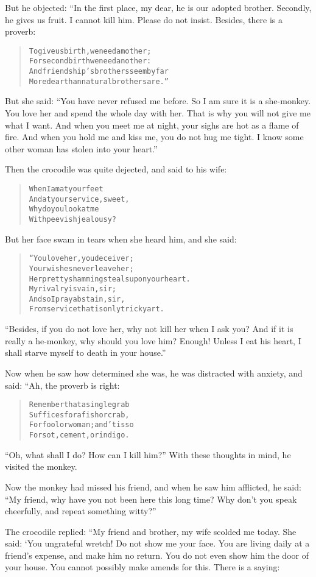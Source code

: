 \documentclass[article, twoside, 14pt]{memoir}
\renewenvironment{verbatim}{%
\begin{quote}%
\vskip -10pt%
\begin{alltt}\normalfont\large}{\end{alltt}%
\end{quote}%
\vskip -10pt
} %
\begin{document}
But he objected: “In the first place, my dear, he is our adopted
brother. Secondly, he gives us fruit. I cannot kill him. Please do
not insist. Besides, there is a proverb:

\begin{verbatim}
To give us birth, we need a mother;
For second birth we need another:
And friendship's brothers seem by far
More dear than natural brothers are.”
\end{verbatim}
But she said:
``You have never refused me before. So I am sure it is a she-monkey. You love her and spend the whole day with her. That is why you will not give me what I want. And when you meet me at night, your sighs are hot as a flame of fire. And when you hold me and kiss me, you do not hug me tight. I know some other woman has stolen into your heart.''

Then the crocodile was quite dejected, and said to his wife:

\begin{verbatim}
When I am at your feet
And at your service, sweet,
Why do you look at me
With peevish jealousy?
\end{verbatim}
But her face swam in tears when she heard him, and she said:

\begin{verbatim}
“You love her, you deceiver;
Your wishes never leave her;
Her pretty shamming steals upon your heart.
    My rivalry is vain, sir;
    And so I pray abstain, sir,
From service that is only tricky art.
\end{verbatim}
``Besides, if you do not love her, why not kill her when I ask you? And if it is really a he-monkey, why should you love him? Enough! Unless I eat his heart, I shall starve myself to death in your house.''

Now when he saw how determined she was, he was distracted with
anxiety, and said: “Ah, the proverb is right:

\begin{verbatim}
Remember that a single grab
Suffices for a fish or crab,
For fool or woman; and 'tis so
For sot, cement, or indigo.
\end{verbatim}
``Oh, what shall I do? How can I kill him?'' With these thoughts in
mind, he visited the monkey.

Now the monkey had missed his friend, and when he saw him
afflicted, he said:
``My friend, why have you not been here this long time? Why don't you speak cheerfully, and repeat something witty?''

The crocodile replied: “My friend and brother, my wife scolded me
today. She said: ‘You ungrateful wretch! Do not show me your face.
You are living daily at a friend's expense, and make him no return.
You do not even show him the door of your house. You cannot
possibly make amends for this. There is a saying:
\end{document}

